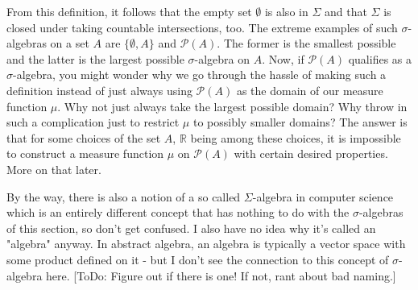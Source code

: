 \medskip
From this definition, it follows that the empty set $\emptyset$ is also in $\Sigma$ and that $\Sigma$ is closed under taking countable intersections, too. The extreme examples of such $\sigma$-algebras on a set $A$ are $\{\emptyset, A\}$ and $\mathcal{P}(A)$. The former is the smallest possible and the latter is the largest possible $\sigma$-algebra on $A$. Now, if $\mathcal{P}(A)$ qualifies as a $\sigma$-algebra, you might wonder why we go through the hassle of making such a definition instead of just always using $\mathcal{P}(A)$ as the domain of our measure function $\mu$. Why not just always take the largest possible domain? Why throw in such a complication just to restrict $\mu$ to possibly smaller domains? The answer is that for some choices of the set $A$, $\mathbb{R}$ being among these choices, it is impossible to construct a measure function $\mu$ on $\mathcal{P}(A)$ with certain desired properties. More on that later.

\medskip
By the way, there is also a notion of a so called $\Sigma$-algebra in computer science which is an entirely different concept that has nothing to do with the $\sigma$-algebras of this section, so don't get confused. I also have no idea why it's called an "algebra" anyway. In abstract algebra, an algebra is typically a vector space with some product defined on it - but I don't see the connection to this concept of $\sigma$-algebra here. [ToDo: Figure out if there is one! If not, rant about bad naming.]









